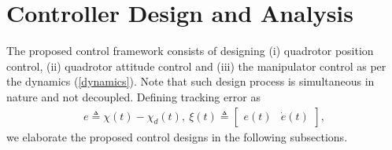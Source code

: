 \documentclass[letterpaper, 10 pt, conference]{ieeeconf}  %
\begin{document}

 


\section{Controller Design and Analysis}

The proposed control framework consists of designing (i)  quadrotor position control, (ii) quadrotor attitude control and (iii) the manipulator control as per the dynamics (\ref{dynamics}). Note that such design process is simultaneous in nature and not decoupled.  
Defining tracking error as  
\begin{align} 
  e \triangleq \chi(t) - \chi_d(t),~\xi(t) \triangleq \begin{bmatrix}
	e(t) & \dot{e}(t)
	\end{bmatrix},
\end{align}  \label{err}
we elaborate the proposed control designs in the following subsections.
	
\end{document}
